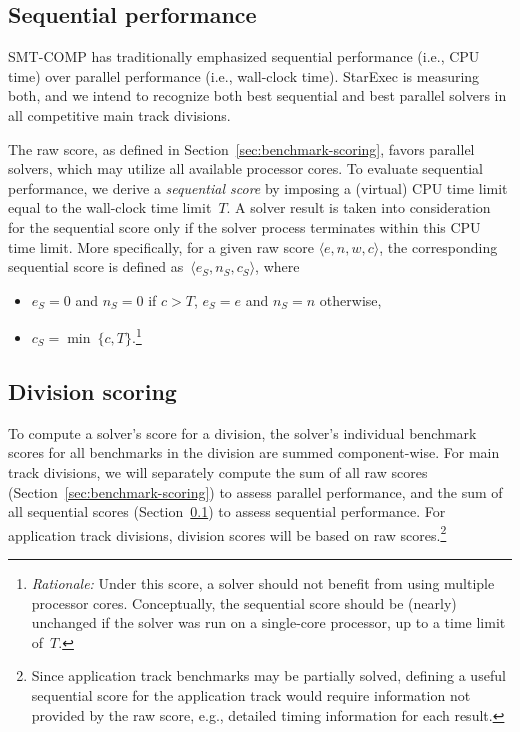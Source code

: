 \documentclass[12pt]{article}
\begin{document}
\subsection{Sequential performance}
\label{sec:sequential}

SMT-COMP has traditionally emphasized sequential performance (i.e.,
CPU time) over parallel performance (i.e., wall-clock time).  StarExec
is measuring both, and we intend to recognize both best sequential and
best parallel solvers in all competitive main track divisions.

The raw score, as defined in Section~\ref{sec:benchmark-scoring},
favors parallel solvers, which may utilize all available processor
cores.  To evaluate sequential performance, we derive a
\emph{sequential score} by imposing a (virtual) CPU time limit equal
to the wall-clock time limit~$T$.  A solver result is taken into
consideration for the sequential score only if the solver process
terminates within this CPU time limit.  More specifically, for a given
raw score $\langle e, n, w, c\rangle$, the corresponding sequential
score is defined as~$\langle e_S, n_S, c_S\rangle$, where
\begin{itemize}
\item $e_S = 0$ and $n_S = 0$ if $c > T$, $e_S = e$ and $n_S = n$
  otherwise,
\item $c_S = \min\ \{c, T\}$.\footnote{\emph{Rationale:} Under this
  score, a solver should not benefit from using multiple processor
  cores.  Conceptually, the sequential score should be (nearly)
  unchanged if the solver was run on a single-core processor, up to a
  time limit of~$T$.}
\end{itemize}

\subsection{Division scoring}
\label{sec:division-scoring}

To compute a solver's score for a division, the solver's individual
benchmark scores for all benchmarks in the division are summed
component-wise.  For main track divisions, we will separately compute
the sum of all raw scores (Section~\ref{sec:benchmark-scoring}) to
assess parallel performance, and the sum of all sequential scores
(Section~\ref{sec:sequential}) to assess sequential performance.  For
application track divisions, division scores will be based on raw
scores.\footnote{Since application track benchmarks may be partially
  solved, defining a useful sequential score for the application track
  would require information not provided by the raw score, e.g.,
  detailed timing information for each result.}
\end{document}

